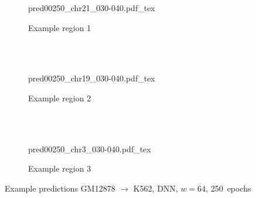 \begin{figure}[p] %
    \begin{subfigure}{\textwidth}
        \centering
        \scriptsize
        {pred00250_chr21_030-040.pdf_tex}
        \caption{Example  region 1} \label{fig:results:DNN64_r1}
    \end{subfigure}\\[2mm]
    \\[3mm]
    \begin{subfigure}{\textwidth}
        \centering
        \scriptsize
        {pred00250_chr19_030-040.pdf_tex}
        \caption{Example region 2} \label{fig:results:DNN64_r2}
    \end{subfigure}\\[2mm]
    \\[3mm]
    \begin{subfigure}{\textwidth}
        \centering
        \scriptsize
        {pred00250_chr3_030-040.pdf_tex}
        \caption{Example region 3} \label{fig:results:DNN64_r3}
    \end{subfigure}
    \caption{Example predictions GM12878 $\rightarrow$ K562, DNN, $w=64$, 250~epochs} \label{fig:results:DNN_matrices}
\end{figure}
\clearpage
